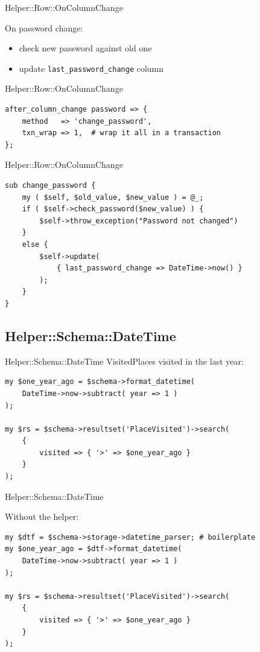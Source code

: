\begin{frame}[fragile]{Helper::Row::OnColumnChange}

On password change:

\begin{itemize}
\item check new password against old one
\item update \verb|last_password_change| column
\end{itemize}

\end{frame}

\begin{frame}[fragile]{Helper::Row::OnColumnChange}
\begin{lstlisting}
after_column_change password => {
    method   => 'change_password',
    txn_wrap => 1,  # wrap it all in a transaction
};
\end{lstlisting}
\end{frame}

\begin{frame}[fragile]{Helper::Row::OnColumnChange}
\begin{lstlisting}
sub change_password {
    my ( $self, $old_value, $new_value ) = @_;
    if ( $self->check_password($new_value) ) {
        $self->throw_exception("Password not changed")
    }
    else {
        $self->update(
            { last_password_change => DateTime->now() }
        );
    }
}
\end{lstlisting}
\end{frame}

\subsection{Helper::Schema::DateTime}

\begin{frame}[fragile]{Helper::Schema::DateTime}
VisitedPlaces visited in the last year:

\begin{lstlisting}
my $one_year_ago = $schema->format_datetime(
    DateTime->now->subtract( year => 1 )
);

my $rs = $schema->resultset('PlaceVisited')->search(
    {
        visited => { '>' => $one_year_ago }
    }
);
\end{lstlisting}
\end{frame}

\begin{frame}[fragile]{Helper::Schema::DateTime}

Without the helper:

\begin{lstlisting}
my $dtf = $schema->storage->datetime_parser; # boilerplate
my $one_year_ago = $dtf->format_datetime(
    DateTime->now->subtract( year => 1 )
);

my $rs = $schema->resultset('PlaceVisited')->search(
    {
        visited => { '>' => $one_year_ago }
    }
);
\end{lstlisting}
\end{frame}

